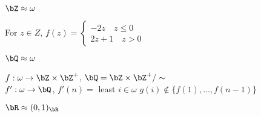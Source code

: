 \begin{lemma}
    $\bZ \approx \omega$ 
\end{lemma}

\begin{pf}
    For $z \in Z$, $f(z)  = \begin{cases} -2z \quad z \le 0 \\ 2z+1 \quad z > 0 \end{cases}$ 
\end{pf}

\begin{lemma}
    $\bQ \approx \omega$ 
\end{lemma}

\begin{pf}
    $f: \omega \to \bZ \times \bZ^+$, $\bQ = \bZ \times \bZ^+/\sim$ \\
    $f': \omega \to \bQ$, $f'(n)=$ least $i \in \omega$ $g(i) \not\in \{f(1), \ldots, f(n-1)\}$ 
\end{pf}

\begin{lemma}
    $\bR \approx (0,1)_{\bR}$ 
\end{lemma}